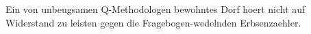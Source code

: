 Ein von unbeugsamen Q-Methodologen bewohntes Dorf hoert nicht auf Widerstand zu leisten gegen die Fragebogen-wedelnden Erbsenzaehler.